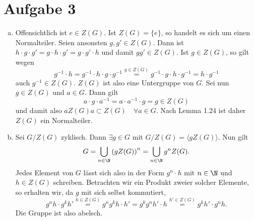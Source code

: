\documentclass{article}
\begin{document}
    \section*{Aufgabe 3}
    \begin{enumerate}[(a)]
        \item Offensichtlich ist $e\in Z(G)$. Ist $Z(G) = \{e\}$, so handelt es sich um einen Normalteiler. Seien ansonsten $g, g' \in Z(G)$. Dann ist $h\cdot g\cdot g' = g \cdot h \cdot g' = g \cdot g'\cdot h$ und damit $gg' \in Z(G)$. Ist $g \in Z(G)$, so gilt wegen
        \[
            g^{-1} \cdot h = g^{-1} \cdot h \cdot g\cdot g^{-1} \overset{g \in Z(G)}{=} g^{-1} \cdot g \cdot h\cdot g^{-1} = h\cdot g^{-1}
        \] auch $g^{-1}\in Z(G)$. $Z(G)$ ist also eine Untergruppe von $G$. Sei nun $g\in Z(G)$ und $a \in G$. Dann gilt 
        \[
            a\cdot g \cdot a^{-1} = a \cdot a^{-1} \cdot g = g \in Z(G)
        \]
         und damit also $aZ(G)a \subset Z(G) \quad \forall a \in G$. Nach Lemma 1.24 ist daher $Z(G)$ ein Normalteiler.
        \item Sei $G/Z(G)$ zyklisch. Dann $\exists g \in G$ mit $G/Z(G) = \langle g Z(G)\rangle$. Nun gilt 
        \[G = \bigcup\limits_{n\in \N} \left(g Z(G)\right)^n = \bigcup\limits_{n\in \N} g^n Z(G).\]
        Jedes Element von $G$ lässt sich also in der Form $g^n\cdot h$ mit $n\in \N$ und $h\in Z(G)$ schreiben. Betrachten wir ein Produkt zweier solcher Elemente, so erhalten wir, da $g$ mit sich selbst kommutiert,
        \[
            g^nh \cdot g^kh' \overset{h\in Z(G)}{=} g^ng^kh\cdot h' = g^kg^n h'\cdot h \overset{h'\in Z(G)}{=} g^k h'\cdot g^n h.
        \]
        Die Gruppe ist also abelsch.
    \end{enumerate}
\end{document}
